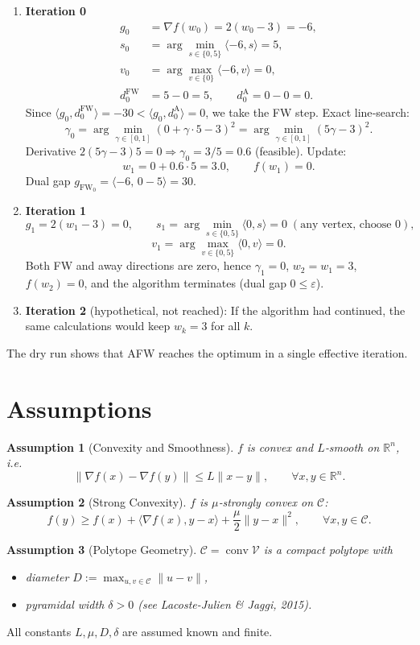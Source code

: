 \documentclass{article}
\newtheorem{assumption}{Assumption}
\newcommand{\gap}{g_{\text{FW}}}
\newcommand{\diam}{D}
\newcommand{\pwidth}{\delta}
\begin{document}
\begin{enumerate}[label=\textbf{Iteration \arabic*:},leftmargin=*]
\item \textbf{Iteration 0}
\begin{align*}
g_0 &=\nabla f(w_0)=2(w_0-3) = -6,\\
s_0 &=\arg\min_{s\in\{0,5\}} \langle -6,s\rangle =5,\\
v_0 &=\arg\max_{v\in\{0\}} \langle -6,v\rangle =0,\\
d_0^{\text{FW}} &=5-0=5,\qquad d_0^{\text{A}} =0-0=0.
\end{align*}
Since $\langle g_0,d_0^{\text{FW}}\rangle=-30<\langle g_0,d_0^{\text{A}}\rangle=0$, we take the FW step.
Exact line‑search:
\[
\gamma_0=\arg\min_{\gamma\in[0,1]} (0+\gamma\cdot5-3)^2 =\arg\min_{\gamma\in[0,1]} (5\gamma-3)^2.
\]
Derivative $2(5\gamma-3)5=0\Rightarrow\gamma_0=3/5=0.6$ (feasible).  
Update:
\[
w_1 = 0 + 0.6\cdot5 = 3.0,\qquad f(w_1)=0.
\]
Dual gap $\gap_0=\langle -6,\,0-5\rangle =30$.

\item \textbf{Iteration 1}
\[
g_1 = 2(w_1-3)=0,\qquad
s_1 =\arg\min_{s\in\{0,5\}}\langle0,s\rangle =0\;( \text{any vertex, choose }0),
\]
\[
v_1 =\arg\max_{v\in\{0,5\}}\langle0,v\rangle =0.
\]
Both FW and away directions are zero, hence $\gamma_1=0$, $w_2=w_1=3$, $f(w_2)=0$, and the algorithm terminates (dual gap $0\le\varepsilon$).

\item \textbf{Iteration 2} (hypothetical, not reached):
If the algorithm had continued, the same calculations would keep $w_k=3$ for all $k$.
\end{enumerate}

The dry run shows that AFW reaches the optimum in a single effective iteration.

\newpage
\section*{Assumptions}
\begin{assumption}[Convexity and Smoothness]\label{ass:convex}
$f$ is convex and $L$‑smooth on $\mathbb{R}^n$, i.e.
\[
\|\nabla f(x)-\nabla f(y)\|\le L\|x-y\|,\qquad\forall x,y\in\mathbb{R}^n .
\]
\end{assumption}
\begin{assumption}[Strong Convexity]\label{ass:strong}
$f$ is $\mu$‑strongly convex on $\mathcal{C}$:
\[
f(y)\ge f(x)+\langle\nabla f(x),y-x\rangle+\frac{\mu}{2}\|y-x\|^2,
\qquad\forall x,y\in\mathcal{C}.
\]
\end{assumption}
\begin{assumption}[Polytope Geometry]\label{ass:polytope}
$\mathcal{C}=\operatorname{conv}\mathcal{V}$ is a compact polytope with
\begin{itemize}
\item diameter $\diam:=\max_{u,v\in\mathcal{C}}\|u-v\|$,
\item \emph{pyramidal width} $\pwidth>0$ (see Lacoste-Julien \& Jaggi, 2015).
\end{itemize}
\end{assumption}
All constants $L,\mu,\diam,\pwidth$ are assumed known and finite.
\end{document}
